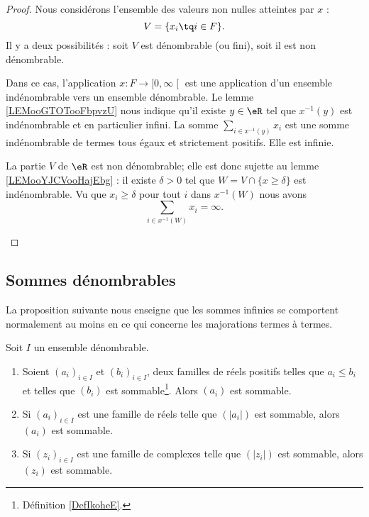 \begin{proof}
	Nous considérons l'ensemble des valeurs non nulles atteintes par \( x\) :
	\begin{equation}
		V=\{ x_i\tq i\in F \}.
	\end{equation}
	Il y a deux possibilités : soit \( V\) est dénombrable (ou fini), soit il est non dénombrable.

	\begin{subproof}
		Dans ce cas, l'application \( x\colon F\to \mathopen[ 0 , \infty \mathclose[\) est une application d'un ensemble indénombrable vers un ensemble dénombrable. Le lemme \ref{LEMooGTOTooFbpvzU} nous indique qu'il existe \( y\in \eR\) tel que \( x^{-1}(y)\) est indénombrable et en particulier infini. La somme \( \sum_{i\in x^{-1}(y)}x_i\) est une somme indénombrable de termes tous égaux et strictement positifs. Elle est infinie.

		La partie \( V\) de \( \eR\) est non dénombrable; elle est donc sujette au lemme \ref{LEMooYJCVooHajEbg} : il existe \( \delta>0\) tel que \( W=V\cap\{ x\geq \delta \}\) est indénombrable. Vu que \( x_i\geq \delta\) pour tout \( i\) dans \( x^{-1}(W)\) nous avons
		\begin{equation}
			\sum_{i\in x^{-1}(W)}x_i=\infty.
		\end{equation}
	\end{subproof}
\end{proof}

\subsection{Sommes dénombrables}

La proposition suivante nous enseigne que les sommes infinies se comportent normalement au moins en ce qui concerne les majorations termes à termes.
\begin{proposition} \label{PropMpBStL}
	Soit \( I\) un ensemble dénombrable. 
    \begin{enumerate}
        \item       \label{ITEMooZSDSooFUqXDO}
            Soient \( (a_i)_{i\in I}\) et \( (b_i)_{i\in I}\), deux familles de réels positifs telles que \( a_i\leq b_i\) et telles que \( (b_i)\) est sommable\footnote{Définition \ref{DefIkoheE}.}. Alors \( (a_i)\) est sommable.
        \item       \label{ITEMooREEYooOtklRb}
	Si \( (a_i)_{i\in I}\) est une famille de réels telle que \( (| a_i |)\) est sommable, alors \( (a_i)\) est sommable.
\item           \label{ITEMooFIGGooWADdLs}
	Si \( (z_i)_{i\in I}\) est une famille de complexes telle que \( (| z_i |)\) est sommable, alors \( (z_i)\) est sommable.
    \end{enumerate}
\end{proposition}

